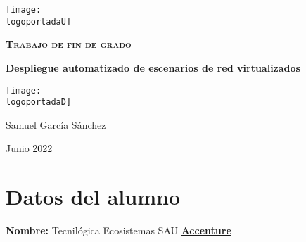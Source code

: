 \documentclass[a4paper, 12pt]{report} %
\newcommand{\logoportadaU}{../imgs/logos/ETSIT1.png}
\newcommand{\logoportadaD}{../imgs/logos/upm2.png}
\newcommand{\titulo}{Despliegue automatizado de escenarios de red virtualizados}
\newcommand{\fecha}{Junio 2022}
\begin{document}
        \begin{titlepage}
        \centering
        \texttt{[image: \\logoportadaU]}\par\vspace{1cm}
        \vfill
        {\scshape\LARGE \textbf{Trabajo de fin de grado}\par}
        \vspace{0.2cm}
        {\Huge\bfseries\textcolor{color1}{\titulo}\par\vspace{1cm}}
        \vfill
        \texttt{[image: \\logoportadaD]}\par\vspace{1cm}
        \vfill
        \begin{tcolorbox}[colback=color1!5!white,colframe=color1!75!color1]
        \centering
                {\large Samuel García Sánchez}
        \end{tcolorbox}
        \vfill
        \fecha\par
        \vfill
        \end{titlepage}
        \clearpage
        \tableofcontents
        \clearpage
        \chapter{Datos del alumno}
	\textbf{Nombre:} Tecnilógica Ecosistemas SAU \href{https://www.accenture.com/es-es/company-tecnilogica-accenture}{\textbf{\color{blue}Accenture}} \par
\end{document}

